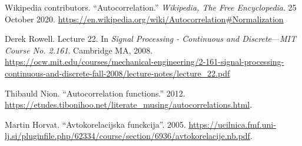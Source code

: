 \documentclass[11pt, a4paper]{article}
\begin{document}
\begin{thebibliography}{}
\setlength{\itemsep}{.2\itemsep}\setlength{\parsep}{.5\parsep}

 Wikipedia contributors. ``Autocorrelation.'' \textit{Wikipedia, The Free Encyclopedia}. 25 October 2020. \url{https://en.wikipedia.org/wiki/Autocorrelation#Normalization}

 Derek Rowell. Lecture 22. In \textit{Signal Processing - Continuous and Discrete}---\textit{MIT Course No. 2.161}. Cambridge MA, 2008.
\url{https://ocw.mit.edu/courses/mechanical-engineering/2-161-signal-processing-continuous-and-discrete-fall-2008/lecture-notes/lecture_22.pdf}

 Thibauld Nion. ``Autocorrelation functions.'' 2012. \url{https://etudes.tibonihoo.net/literate_musing/autocorrelations.html}. 

 Martin Horvat. ``Avtokorelacijska funckcija''. 2005. \url{https://ucilnica.fmf.uni-lj.si/pluginfile.php/62334/course/section/6936/avtokorelacije.nb.pdf}.

\end{thebibliography}
\end{document}
